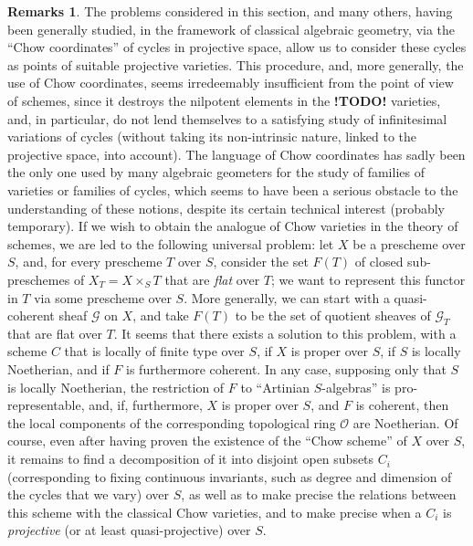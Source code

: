 \documentclass{article}
\theoremstyle{plain}
\theoremstyle{definition}
\newtheorem*{remarks*}{Remarks}
\newcommand{\sh}[1]{{\mathscr{#1}}}
\newcommand{\todo}{\textbf{ !TODO! }}
\newcommand{\oldpage}[1]{\marginpar{\footnotesize$\Big\vert$ \textit{p.~#1}}}
\begin{document}
\begin{remarks*}
  The problems considered in this section, and many others, having been generally studied, in the framework of classical algebraic geometry, via the ``Chow coordinates'' of cycles in projective space, allow us to consider these cycles as points of suitable projective varieties.
  This procedure, and, more generally, the use of Chow coordinates, seems irredeemably insufficient from the point of view of schemes, since it destroys the nilpotent elements in the \todo varieties, and, in particular, do not lend themselves to a satisfying study of infinitesimal variations of cycles (without taking its non-intrinsic nature, linked to the projective space, into account).
  The language of Chow coordinates has sadly been the only one used by many algebraic geometers for the study of families of varieties or families of cycles, which seems to have been a serious obstacle to the understanding of these notions, despite its certain technical interest (probably temporary).
  If we wish to obtain the analogue of Chow varieties in the theory of schemes, we are led to the following universal problem:
  let $X$ be a prescheme over $S$, and, for every prescheme $T$ over $S$, consider the set $F(T)$ of closed sub-preschemes of $X_T=X\times_S T$ that are \emph{flat} over $T$; we want to represent this functor in $T$ via some prescheme over $S$.
  More generally, we can start with a quasi-coherent sheaf $\sh{G}$ on $X$, and take $F(T)$ to be the set of
\oldpage{195-15}
  quotient sheaves of $\sh{G}_T$ that are flat over $T$.
  It seems that there exists a solution to this problem, with a scheme $C$ that is locally of finite type over $S$, if $X$ is proper over $S$, if $S$ is locally Noetherian, and if $F$ is furthermore coherent.
  In any case, supposing only that $S$ is locally Noetherian, the restriction of $F$ to ``Artinian $S$-algebras'' is pro-representable, and, if, furthermore, $X$ is proper over $S$, and $F$ is coherent, then the local components of the corresponding topological ring $\sh{O}$ are Noetherian.
  Of course, even after having proven the existence of the ``Chow scheme'' of $X$ over $S$, it remains to find a decomposition of it into disjoint open subsets $C_i$ (corresponding to fixing continuous invariants, such as degree and dimension of the cycles that we vary) over $S$, as well as to make precise the relations between this scheme with the classical Chow varieties, and to make precise when a $C_i$ is \emph{projective} (or at least quasi-projective) over $S$.
\end{remarks*}
\end{document}
